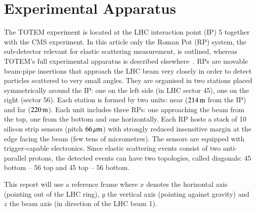 \section{Experimental Apparatus}

The TOTEM experiment is located at the LHC interaction point (IP) 5 together 
with the CMS experiment. In this article only the Roman Pot (RP) system, the 
sub-detector relevant for elastic scattering measurement, is outlined, 
whereas TOTEM's full experimental apparatus is described %
elsewhere~\cite{totem-jinst}. 
RPs are movable beam-pipe
insertions that approach the LHC beam very closely in order to detect particles scattered to very small angles. They are organised in two stations placed symmetrically around the IP: one on the left side (in LHC sector 45), one on the right (sector 56). Each station is formed by two units: near ($214\,{\rm m}$ from the IP) and far ($220\,{\rm m}$). Each unit includes three RPs: one approaching the beam from the top, one from the bottom and one horizontally. Each RP hosts a stack of 10 silicon strip sensors (pitch $66\,{\rm \mu m}$) with strongly reduced insensitive margin at the edge facing the beam (few tens of micrometres). The sensors are equipped with trigger-capable electronics. Since elastic scattering events consist of two anti-parallel protons, the detected events can have two topologies, called diagonals: 45 bottom -- 56 top and 45 top -- 56 bottom.

This report will use a reference frame where $x$ denotes the horizontal axis (pointing out of the LHC ring), $y$ the vertical axis (pointing against gravity) and $z$ the beam axis (in direction of the LHC beam 1).
